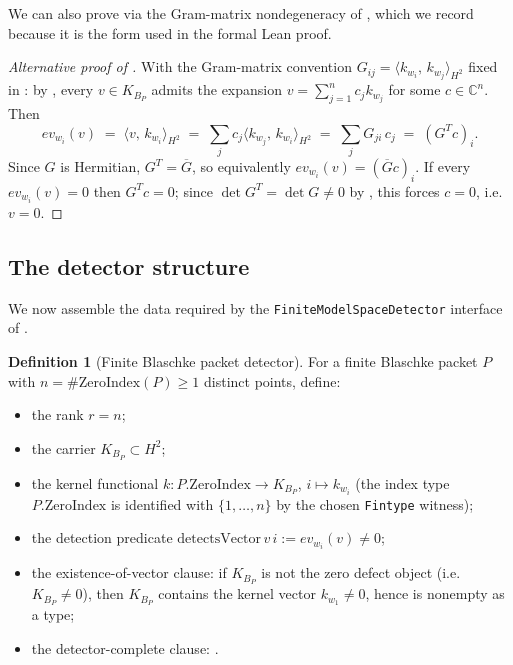 \documentclass[12pt]{article}
\theoremstyle{definition}
\newtheorem{definition}[theorem]{Definition}
\theoremstyle{remark}
\newcommand{\C}{\mathbb{C}}
\newcommand{\HHH}{H^{2}}
\newcommand{\KBP}{K_{B_{P}}}
\newcommand{\inner}[2]{\langle #1,\,#2\rangle}
\newcommand{\conj}[1]{\overline{#1}}
\begin{document}
We can also prove  via the Gram-matrix
nondegeneracy of , which we record because it is the
form used in the formal Lean proof.

\begin{proof}[Alternative proof of ]
With the Gram-matrix convention $G_{ij}=\inner{k_{w_{i}}}{k_{w_{j}}}_{\HHH}$
fixed in : by
, every $v\in\KBP$ admits the expansion
$v=\sum_{j=1}^{n}c_{j}k_{w_{j}}$ for some $c\in\C^{n}$. Then
\[
  ev_{w_{i}}(v)\;=\;\inner{v}{k_{w_{i}}}_{\HHH}
       \;=\;\sum_{j}c_{j}\inner{k_{w_{j}}}{k_{w_{i}}}_{\HHH}
       \;=\;\sum_{j}G_{ji}\,c_{j}\;=\;(G^{T}c)_{i}.
\]
Since $G$ is Hermitian, $G^{T}=\conj{G}$, so equivalently $ev_{w_{i}}(v)=(\conj{G}c)_{i}$.
If every $ev_{w_{i}}(v)=0$ then $G^{T}c=0$; since $\det G^{T}=\det G\neq0$
by , this forces $c=0$, i.e. $v=0$.
\end{proof}

\subsection{The detector structure}

We now assemble the data required by the
\texttt{FiniteModelSpaceDetector} interface of \cite[\S2.7]{Vol5KB}.

\begin{definition}[Finite Blaschke packet detector]\label{def:packet-detector}
For a finite Blaschke packet $P$ with $n=\#\mathrm{ZeroIndex}(P)\ge1$
distinct points, define:
\begin{itemize}\itemsep0pt
  \item the rank $r=n$;
  \item the carrier $\KBP\subset\HHH$;
  \item the kernel functional
        $k:P.\mathrm{ZeroIndex}\to\KBP$, $i\mapsto k_{w_{i}}$ (the
        index type $P.\mathrm{ZeroIndex}$ is identified with $\{1,\dots,n\}$
        by the chosen \texttt{Fintype} witness);
  \item the detection predicate
        $\mathrm{detectsVector}\,v\,i:=ev_{w_{i}}(v)\neq0$;
  \item the existence-of-vector clause: if $\KBP$ is not the zero defect
        object (i.e. $\KBP\neq0$), then $\KBP$ contains the kernel vector
        $k_{w_{1}}\neq0$, hence is nonempty as a type;
  \item the detector-complete clause: .
\end{itemize}
\end{definition}
\end{document}
